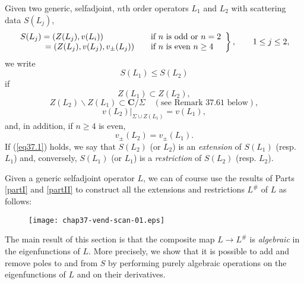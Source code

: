 \documentclass{surv-l}
\theoremstyle{plain}
\theoremstyle{definition}
\numberwithin{equation}{chapter}
\begin{document}
Given two generic, selfadjoint, $n$th order operators $L_{1}$ and $L_{2}$ with scattering data $S(L_{j})$,
\begin{align*}
\left.
\begin{array}{@{}ll@{}}
\begin{array}{@{}l@{}}
S(L_{j})=(Z(L_{j}),v(L_{i}))\\
\qquad\quad=(Z(L_{j}),v(L_{j}),v_{\pm}(L_{j}))
\end{array}
\begin{array}{@{}l@{}}
\qquad\text{if $n$ is odd or }n=2\\
\qquad\text{if $n$ is even }n \geq 4
\end{array}
\end{array}
\right\},\qquad 1\leq j\leq 2,
\end{align*}
we write
\begin{equation}\label{eq37.1}
S(L_{1})\leq S(L_{2})
\end{equation}
if
\begin{equation}\label{eq37.2}
Z(L_{1})\subset Z(L_{2}),
\end{equation}
\begin{equation}\label{eq37.3}
Z(L_{2})\backslash Z(L_{1})\subset \mathbf{C}/\Sigma\quad (\text{see Remark 37.61 below}),
\end{equation}
\begin{equation}\label{eq37.4}
v(L_{2})|_{\Sigma\cup Z(L_{1})}=v(L_{1}),
\end{equation}
and, in addition, if $n\geq 4$ is even,
\begin{equation}\label{eq37.5}
v_{\pm}(L_{2})=v_{\pm}(L_{1}).
\end{equation}
If (\ref{eq37.1}) holds, we say that $S(L_{2})$ (or $L_{2}$) is an \emph{extension} of $S(L_{1})$ (resp. $L_{1}$) and, conversely, $S(L_{1})$ (or $L_{1}$) is a \emph{restriction} of $S(L_{2})$ (resp. $L_{2}$).

Given a generic selfadjoint operator $L$, we can of course use the results of Parts \ref{partI} and \ref{partII} to construct all
the extensions and restrictions $L^{\#}$ of $L$ as follows:
\begin{figure}[h]
\texttt{[image: chap37-vend-scan-01.eps]}
\end{figure}
The main result of this section is that the composite map $L\rightarrow L^{\#}$ is \emph{algebraic} in the eigenfunctions of $L$. More precisely, we show that it is possible to add and remove poles to and from $S$ by performing purely algebraic operations on the eigenfunctions of $L$ and on their derivatives.
\end{document}
